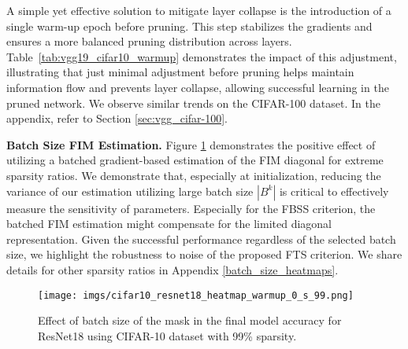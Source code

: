 A simple yet effective solution to mitigate layer collapse is the introduction of a single warm-up epoch before pruning. This step stabilizes the gradients and ensures a more balanced pruning distribution across layers. Table~\ref{tab:vgg19_cifar10_warmup} demonstrates the impact of this adjustment, illustrating that just minimal adjustment before pruning helps maintain information flow and prevents layer collapse, allowing successful learning in the pruned network. We observe similar trends on the CIFAR-100 dataset. In the appendix, refer to Section \ref{sec:vgg_cifar-100}.

\textbf{Batch Size FIM Estimation.} Figure \ref{fig:heatmap_s_99} demonstrates the positive effect of utilizing a batched gradient-based estimation of the FIM diagonal for extreme sparsity ratios. We demonstrate that, especially at initialization, reducing the variance of our estimation utilizing large batch size $|B^k|$ is critical to effectively measure the sensitivity of parameters. Especially for the FBSS criterion, the batched FIM estimation might compensate for the limited diagonal representation. Given the successful performance regardless of the selected batch size, we highlight the robustness to noise of the proposed FTS criterion. We share details for other sparsity ratios in Appendix \ref{batch_size_heatmaps}.
\begin{figure}[htp]
    \centering
    \texttt{[image: imgs/cifar10\_resnet18\_heatmap\_warmup\_0\_s\_99.png]}
    \caption{Effect of batch size of the mask in the final model accuracy for ResNet18 using CIFAR-10 dataset with 99\% sparsity.}
    \label{fig:heatmap_s_99}
\end{figure}